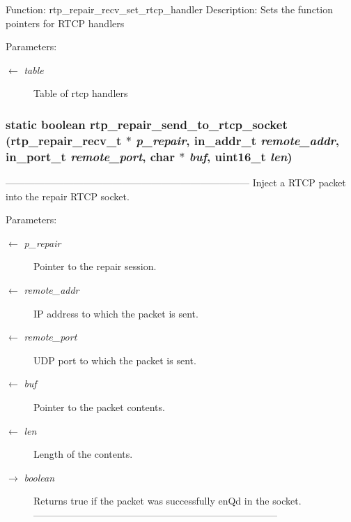 Function: rtp\_\-repair\_\-recv\_\-set\_\-rtcp\_\-handler Description: Sets the function pointers for RTCP handlers \begin{Desc}
\item[Parameters:]
\begin{description}
\item[\mbox{$\leftarrow$} {\em table}]Table of rtcp handlers \end{description}
\end{Desc}
\subsubsection{\setlength{\rightskip}{0pt plus 5cm}static boolean rtp\_\-repair\_\-send\_\-to\_\-rtcp\_\-socket (\bf{rtp\_\-repair\_\-recv\_\-t} $\ast$ {\em p\_\-repair}, in\_\-addr\_\-t {\em remote\_\-addr}, in\_\-port\_\-t {\em remote\_\-port}, char $\ast$ {\em buf}, uint16\_\-t {\em len})\hspace{0.3cm}{\tt  [static]}}\label{rtp__repair__recv_8c_1955349ee797b7e5908282e0ad58a959}


--------------------------------------------------------------------------- Inject a RTCP packet into the repair RTCP socket.

\begin{Desc}
\item[Parameters:]
\begin{description}
\item[\mbox{$\leftarrow$} {\em p\_\-repair}]Pointer to the repair session. \item[\mbox{$\leftarrow$} {\em remote\_\-addr}]IP address to which the packet is sent. \item[\mbox{$\leftarrow$} {\em remote\_\-port}]UDP port to which the packet is sent. \item[\mbox{$\leftarrow$} {\em buf}]Pointer to the packet contents. \item[\mbox{$\leftarrow$} {\em len}]Length of the contents. \item[\mbox{$\rightarrow$} {\em boolean}]Returns true if the packet was successfully en\-Qd in the socket. --------------------------------------------------------------------------- \end{description}
\end{Desc}
